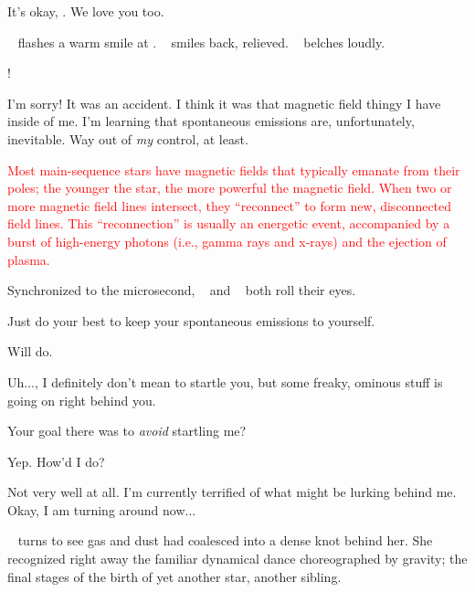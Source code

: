 \documentclass[main.tex]{subfiles}
\begin{document}
\par \Sterope It's okay, \rmmaia.  We love you too.

\par \nar \rmsterope~ flashes a warm smile at \rmmaia.  \rmmaia~ smiles back, relieved.  \rmalcyone~ belches loudly.

\par \Sterope \rmalcyone!

\par \Alcyone I'm sorry!  It was an accident.  I think it was that magnetic field thingy I have inside of me.  I'm learning that spontaneous emissions are, unfortunately, inevitable.  Way out of \textit{my} control, at least.

\begin{tcolorbox}[sharp corners, colback=red!30, colframe=red!80!blue, title=Reconnection of Magnetic Field Lines]
\par \textcolor{red} {Most main-sequence stars have magnetic fields that typically emanate from their poles; the younger the star, the more powerful the magnetic field.  When two or more magnetic field lines intersect, they ``reconnect'' to form new, disconnected field lines.  This ``reconnection'' is usually an energetic event, accompanied by a burst of high-energy photons (i.e., gamma rays and x-rays) and the ejection of plasma.}   
\end{tcolorbox}

\par \nar Synchronized to the microsecond, \rmmaia~ and \rmsterope~ both roll their eyes.

\par \Maia Just do your best to keep your spontaneous emissions to yourself.

\par \Alcyone Will do. 

\par \Electra Uh...\rmmaia, I definitely don't mean to startle you, but some freaky, ominous stuff is going on right behind you.

\par \Maia Your goal there was to \textit{avoid} startling me?

\par \Electra Yep.  How'd I do?

\par \Maia Not very well at all.  I'm currently terrified of what might be lurking behind me.  Okay, I am turning around now...

\par \nar \rmmaia~ turns to see gas and dust had coalesced into a dense knot behind her.  She recognized right away the familiar dynamical dance choreographed by gravity; the final stages of the birth of yet another star, another sibling.
\end{document}
